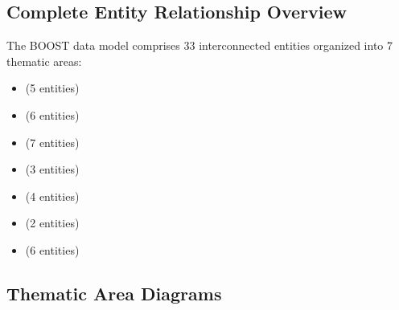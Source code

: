 
\subsection{Complete Entity Relationship Overview}
\label{sec:complete-erd-overview}

The BOOST data model comprises 33 interconnected entities organized into 7 thematic areas:

\begin{itemize}
    \item {} (5 entities)
    \item {} (6 entities)
    \item {} (7 entities)
    \item {} (3 entities)
    \item {} (4 entities)
    \item {} (2 entities)
    \item {} (6 entities)
\end{itemize}


\subsection{Thematic Area Diagrams}
\label{sec:thematic-area-diagrams}

